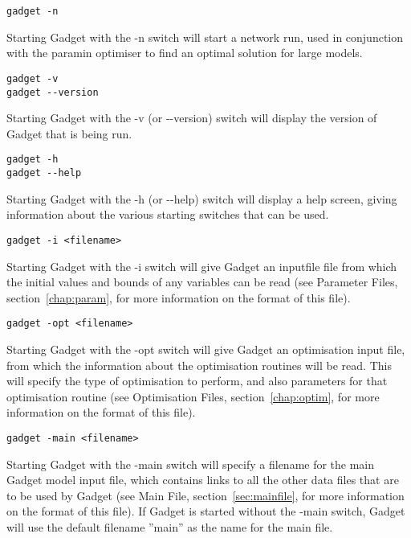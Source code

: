 \documentclass [a4paper, 10pt]{book}
\begin{document}
{\small\begin{verbatim}
gadget -n
\end{verbatim}}
Starting Gadget with the -n switch will start a network run, used in conjunction with the paramin optimiser to find an optimal solution for large models.

{\small\begin{verbatim}
gadget -v
gadget --version
\end{verbatim}}
Starting Gadget with the -v (or -\hspace{0pt}-version) switch will display the version of Gadget that is being run.

{\small\begin{verbatim}
gadget -h
gadget --help
\end{verbatim}}
Starting Gadget with the -h (or -\hspace{0pt}-help) switch will display a help screen, giving information about the various starting switches that can be used.

{\small\begin{verbatim}
gadget -i <filename>
\end{verbatim}}
Starting Gadget with the -i switch will give Gadget an inputfile file from which the initial values and bounds of any variables can be read (see Parameter Files, section~\ref{chap:param}, for more information on the format of this file).

{\small\begin{verbatim}
gadget -opt <filename>
\end{verbatim}}
Starting Gadget with the -opt switch will give Gadget an optimisation input file, from which the information about the optimisation routines will be read.  This will specify the type of optimisation to perform, and also parameters for that optimisation routine (see Optimisation Files, section~\ref{chap:optim}, for more information on the format of this file).

{\small\begin{verbatim}
gadget -main <filename>
\end{verbatim}}
Starting Gadget with the -main switch will specify a filename for the main Gadget model input file, which contains links to all the other data files that are to be used by Gadget (see Main File, section~\ref{sec:mainfile}, for more information on the format of this file).  If Gadget is started without the -main switch, Gadget will use the default filename ''main'' as the name for the main file.
\end{document}
